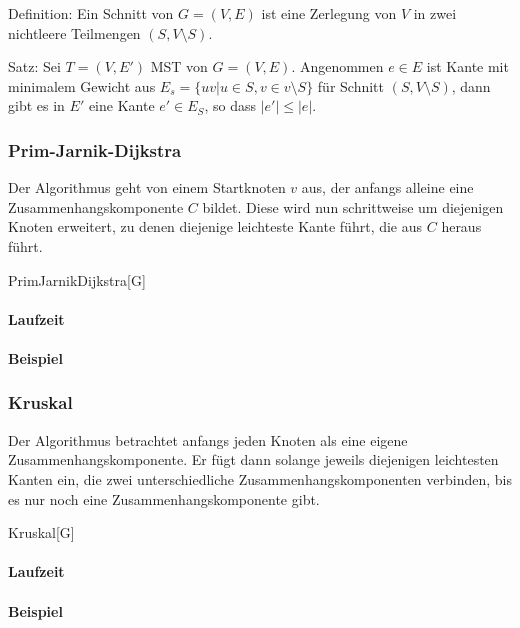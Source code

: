 Definition: Ein Schnitt von $G = (V, E)$ ist eine Zerlegung von $V$ in zwei nichtleere Teilmengen $(S, V \setminus S)$.

Satz: Sei $T = (V, E')$ MST von $G = (V, E)$.
Angenommen $e \in E$ ist Kante mit minimalem Gewicht aus $E_{s} = \{uv | u \in S, v \in v\setminus S\}$ für Schnitt $(S, V \setminus S)$,
dann gibt es in $E'$ eine Kante $e' \in E_{S}$, so dass $|e'| \leq |e|$.

\subsubsection{Prim-Jarnik-Dijkstra}
\label{subsubsec:PrimJarnikDijkstra}
Der Algorithmus geht von einem Startknoten $v$ aus,
der anfangs alleine eine Zusammenhangskomponente $C$ bildet.
Diese wird nun schrittweise um diejenigen Knoten erweitert,
zu denen diejenige leichteste Kante führt, die aus $C$ heraus führt.

\begin{algorithm}{PrimJarnikDijkstra}[G]{
	\qinput{}
	\qoutput{}
}
\end{algorithm}

\paragraph{Laufzeit}

\paragraph{Beispiel}

\subsubsection{Kruskal}
\label{subsubsec:Kruskal}
Der Algorithmus betrachtet anfangs jeden Knoten als eine eigene Zusammenhangskomponente.
Er fügt dann solange jeweils diejenigen leichtesten Kanten ein,
die zwei unterschiedliche Zusammenhangskomponenten verbinden,
bis es nur noch eine Zusammenhangskomponente gibt.

\begin{algorithm}{Kruskal}[G]{
	\qinput{}
	\qoutput{}
}
\end{algorithm}

\paragraph{Laufzeit}

\paragraph{Beispiel}


